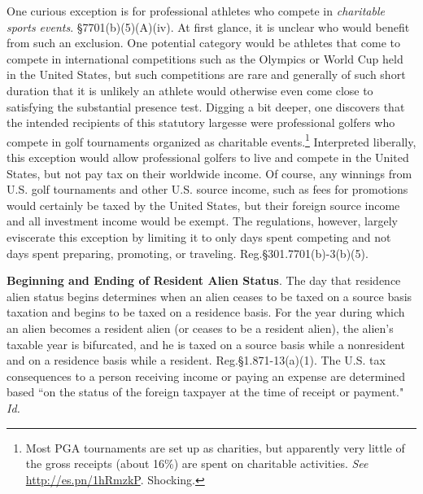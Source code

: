 One curious exception is for professional athletes who compete in \emph{charitable sports events}. \S7701(b)(5)(A)(iv).  At first glance, it is unclear who would benefit from such an exclusion.  One potential category would be athletes that come to compete in international competitions such as the Olympics or World Cup held in the United States, but such competitions are rare and generally of such short duration that it is unlikely an athlete would otherwise even come close to satisfying the substantial presence test. Digging a bit deeper, one discovers that the intended recipients of this statutory largesse were professional golfers who compete in golf tournaments organized as charitable events.\footnote{Most PGA tournaments are set up as charities, but apparently very little of the gross receipts (about 16\%) are spent on charitable activities. \emph{See} \url{http://es.pn/1hRmzkP}.   Shocking.}  Interpreted liberally, this exception would allow professional golfers to live and compete in the United States, but not pay tax on their worldwide income.  Of course, any winnings from U.S. golf tournaments and other U.S. source income, such as fees for promotions would certainly be taxed by the United States, but their foreign source income and all investment income would be exempt.  The regulations, however, largely eviscerate this exception by limiting it to only days spent competing and not days spent preparing, promoting, or traveling.    Reg.\@ \S301.7701(b)-3(b)(5).


\textbf{Beginning and Ending of Resident Alien Status}.  The day that residence alien status begins determines when an alien ceases to be taxed on a source basis taxation and begins to be taxed on a residence basis.  For the year during which an alien becomes a resident alien (or ceases to be a resident alien), the alien's taxable year is bifurcated, and he is taxed on a source basis while a nonresident and on a residence basis while a resident. Reg.\@ \S1.871-13(a)(1).  The U.S. tax consequences to a person receiving income or paying an expense are determined based ``on the status of the foreign taxpayer at the time of receipt or payment." \emph{Id.}  


